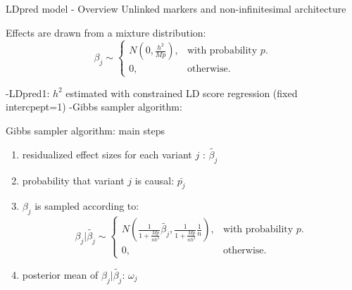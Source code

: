 \documentclass{beamer}
\begin{document}
    \begin{frame}{LDpred model - Overview}
    Unlinked markers and non-infinitesimal architecture\\
    \newline
    
    Effects are drawn from a mixture distribution:
    \begin{equation}
 \beta_{j}\sim\begin{cases}
    N(0, \frac{h^2}{Mp}), & \text{with probability $p$}.\\
    0, & \text{otherwise}.
  \end{cases}
  \end{equation}
\newline

  -LDpred1: $h^2$ estimated with constrained LD score regression (fixed intercpept=1)
  \newline
  -Gibbs sampler algorithm:
  \end{frame}
    
       \begin{frame}{Gibbs sampler algorithm: main steps}
  \begin{enumerate}
    \item residualized effect sizes for each variant $j$ : $\tilde{\beta_{j}}$
      \item probability that variant $j$ is causal: $\bar{p_{j}}$
      \item $\beta_{j}$ is sampled according to:
         \begin{equation}
 \beta_{j}|\tilde{\beta_{j}}\sim\begin{cases}
    N(\frac{1}{1+\frac{Mp}{nh^2}}\tilde{\beta_{j}},\frac{1}{1+\frac{Mp}{nh^2}}\frac{1}{n}), & \text{with probability $p$}.\\
    0, & \text{otherwise}.
  \end{cases}
  \end{equation}
      \item posterior mean of $\beta_{j}|\tilde{\beta_{j}}$: $\omega_{j}$
  
  \end{enumerate}
  
       \end{frame}
       
\end{document}
